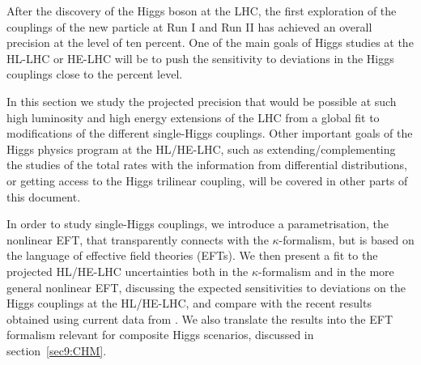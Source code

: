 After the discovery of the Higgs boson at the LHC, the first exploration of the couplings of the new particle at Run I and Run II has achieved an overall precision at the level of ten percent. One of the main goals of Higgs studies at the HL-LHC or HE-LHC will be to push the sensitivity to deviations in the Higgs couplings close to the percent level. 

In this section we study the projected precision that would be possible at such high luminosity and high energy extensions of the LHC from a global fit to modifications of the different single-Higgs couplings. Other important goals of the Higgs physics program at the HL/HE-LHC, such as extending/complementing the studies of the total rates with the information from differential distributions, or getting access to the Higgs trilinear coupling, will be covered in other parts of this document. 


In order to study single-Higgs couplings, we introduce a parametrisation, the nonlinear EFT, that transparently connects with the $\kappa$-formalism, but is based on the language of effective field theories (EFTs). 
 We then present a fit to the projected HL/HE-LHC uncertainties both in the $\kappa$-formalism and in the more general nonlinear EFT, discussing the expected sensitivities to deviations on the Higgs couplings at the HL/HE-LHC, and compare with the recent results obtained using current data from \cite{deBlas:2018tjm}. We also translate the results into the EFT formalism relevant for composite Higgs scenarios, discussed in section~\ref{sec9:CHM}.
 


